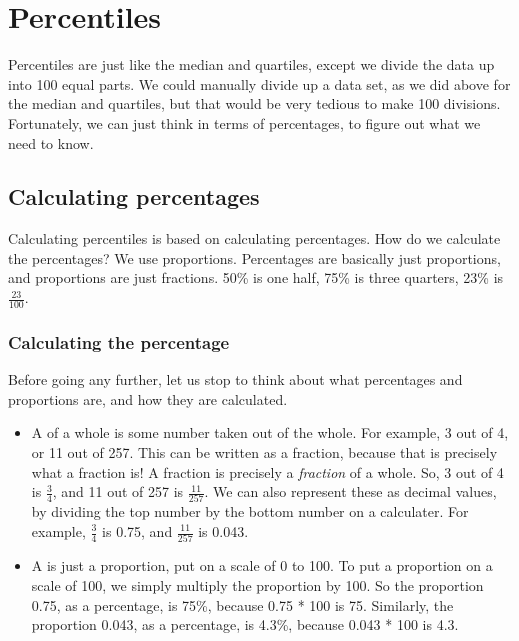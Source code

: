 \documentclass[../../../main.tex]{subfiles}
\begin{document}
\section{Percentiles}

Percentiles are just like the median and quartiles, except we divide the data up into 100 equal parts. We could manually divide up a data set, as we did above for the median and quartiles, but that would be very tedious to make 100 divisions. Fortunately, we can just think in terms of percentages, to figure out what we need to know.


\subsection{Calculating percentages}

Calculating percentiles is based on calculating percentages. How do we calculate the percentages? We use proportions. Percentages are basically just proportions, and proportions are just fractions. 50\% is one half, 75\% is three quarters, 23\% is $\frac{23}{100}$.


\subsubsection{Calculating the percentage}

Before going any further, let us stop to think about what percentages and proportions are, and how they are calculated. 

\begin{itemize}

  \item A  of a whole is some number taken out of the whole. For example, 3 out of 4, or 11 out of 257. This can be written as a fraction, because that is precisely what a fraction is! A fraction is precisely a \emph{fraction} of a whole. So, 3 out of 4 is $\frac{3}{4}$, and 11 out of 257 is $\frac{11}{257}$. We can also represent these as decimal values, by dividing the top number by the bottom number on a calculater. For example, $\frac{3}{4}$ is 0.75, and $\frac{11}{257}$ is 0.043.
  
  \item A  is just a proportion, put on a scale of 0 to 100. To put a proportion on a scale of 100, we simply multiply the proportion by 100. So the proportion 0.75, as a percentage, is 75\%, because 0.75 * 100 is 75. Similarly, the proportion 0.043, as a percentage, is 4.3\%, because 0.043 * 100 is 4.3.

\end{itemize}
\end{document}
